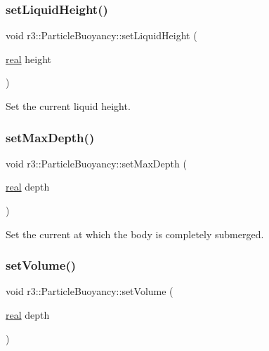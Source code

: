 \subsubsection{\texorpdfstring{set\+Liquid\+Height()}{setLiquidHeight()}}
{\footnotesize\ttfamily void r3\+::\+Particle\+Buoyancy\+::set\+Liquid\+Height (\begin{DoxyParamCaption}\item[{\mbox{\hyperlink{namespacer3_ab2016b3e3f743fb735afce242f0dc1eb}{real}}}]{height }\end{DoxyParamCaption})}



Set the current liquid height. 

\mbox{\label{classr3_1_1_particle_buoyancy_a09b780ceb66884f0381da22ed9f35b83}} 
\subsubsection{\texorpdfstring{set\+Max\+Depth()}{setMaxDepth()}}
{\footnotesize\ttfamily void r3\+::\+Particle\+Buoyancy\+::set\+Max\+Depth (\begin{DoxyParamCaption}\item[{\mbox{\hyperlink{namespacer3_ab2016b3e3f743fb735afce242f0dc1eb}{real}}}]{depth }\end{DoxyParamCaption})}



Set the current at which the body is completely submerged. 

\mbox{\label{classr3_1_1_particle_buoyancy_acd41f54ee680a742284a7b5473935e19}} 
\subsubsection{\texorpdfstring{set\+Volume()}{setVolume()}}
{\footnotesize\ttfamily void r3\+::\+Particle\+Buoyancy\+::set\+Volume (\begin{DoxyParamCaption}\item[{\mbox{\hyperlink{namespacer3_ab2016b3e3f743fb735afce242f0dc1eb}{real}}}]{depth }\end{DoxyParamCaption})}



